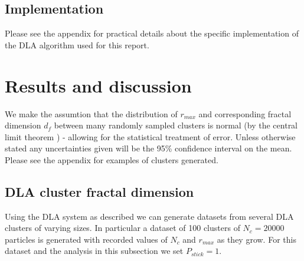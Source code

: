 \documentclass[10pt, twocolumn]{article} %
\begin{document}
\subsection*{Implementation}
  Please see the appendix for practical details about the specific implementation of the DLA algorithm used for this report.

\section*{Results and discussion}
  We make the assumtion that the distribution of $r_{max}$ and corresponding fractal dimension $d_f$ between many randomly sampled clusters is normal (by the central limit theorem \cite{Sadovnik_2016}) - allowing for the statistical treatment of error. Unless otherwise stated any uncertainties given will be the 95\% confidence interval on the mean. Please see the appendix for examples of clusters generated.

\subsection*{DLA cluster fractal dimension}
  Using the DLA system as described we can generate datasets from several DLA clusters of varying sizes. In particular a dataset of 100 clusters of $N_c = 20000$ particles is generated with recorded values of $N_c$ and $r_{max}$ as they grow. For this dataset and the analysis in this subsection we set $P_{stick} = 1$.
\end{document}
